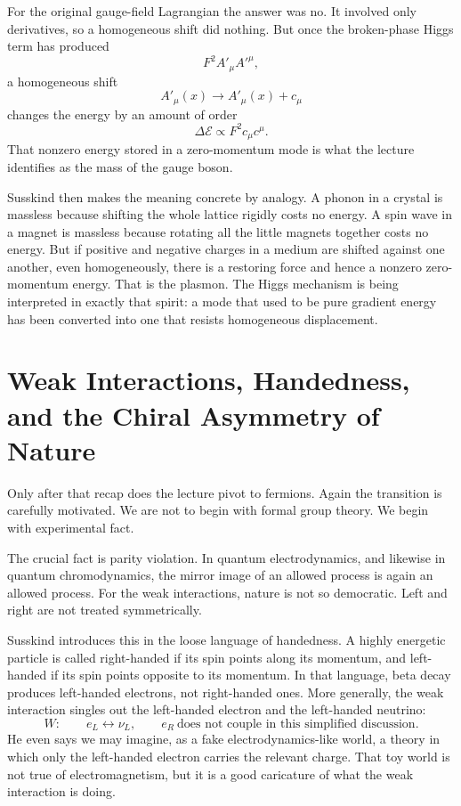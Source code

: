 For the original gauge-field Lagrangian the answer was no. It involved only derivatives, so a homogeneous shift did nothing. But once the broken-phase Higgs term has produced
\begin{equation}
F^2A'_\mu A'^\mu,
\end{equation}
a homogeneous shift
\begin{equation}
A'_\mu(x)\longrightarrow A'_\mu(x)+c_\mu
\end{equation}
changes the energy by an amount of order
\begin{equation}
\Delta\mathcal{E}\propto F^2 c_\mu c^\mu.
\end{equation}
That nonzero energy stored in a zero-momentum mode is what the lecture identifies as the mass of the gauge boson.

Susskind then makes the meaning concrete by analogy. A phonon in a crystal is massless because shifting the whole lattice rigidly costs no energy. A spin wave in a magnet is massless because rotating all the little magnets together costs no energy. But if positive and negative charges in a medium are shifted against one another, even homogeneously, there is a restoring force and hence a nonzero zero-momentum energy. That is the plasmon. The Higgs mechanism is being interpreted in exactly that spirit: a mode that used to be pure gradient energy has been converted into one that resists homogeneous displacement.

\section{Weak Interactions, Handedness, and the Chiral Asymmetry of Nature}

Only after that recap does the lecture pivot to fermions. Again the transition is carefully motivated. We are not to begin with formal group theory. We begin with experimental fact.

The crucial fact is parity violation. In quantum electrodynamics, and likewise in quantum chromodynamics, the mirror image of an allowed process is again an allowed process. For the weak interactions, nature is not so democratic. Left and right are not treated symmetrically.

Susskind introduces this in the loose language of handedness. A highly energetic particle is called right-handed if its spin points along its momentum, and left-handed if its spin points opposite to its momentum. In that language, beta decay produces left-handed electrons, not right-handed ones. More generally, the weak interaction singles out the left-handed electron and the left-handed neutrino:
\begin{equation}
W:\qquad e_L \leftrightarrow \nu_L,
\qquad e_R \ \text{does not couple in this simplified discussion.}
\end{equation}
He even says we may imagine, as a fake electrodynamics-like world, a theory in which only the left-handed electron carries the relevant charge. That toy world is not true of electromagnetism, but it is a good caricature of what the weak interaction is doing.

